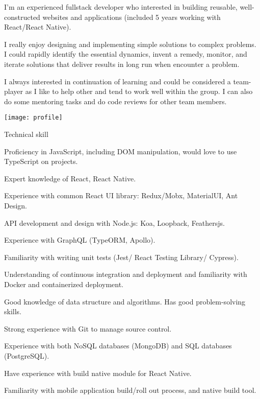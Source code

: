 \documentclass{resume}
\begin{document}

  \noindent\begin{minipage}{0.8\textwidth}%
    I'm an experienced fullstack developer who interested in building reusable, well-constructed websites and applications
    (included 5 years working with React/React Native). \newline
    
    I really enjoy designing and implementing simple solutions to complex problems. 
    I could rapidly identify the essential dynamics, invent a remedy, monitor, and iterate solutions 
    that deliver results in long run when encounter a problem. \newline

    I always interested in continuation of learning and could be considered a team-player as I like to help other and tend 
    to work well within the group. I can also do some mentoring tasks and do code reviews for other team members. \newline
    \end{minipage}%
    \hfill%
    \begin{minipage}{0.1\textwidth}\raggedright
      \texttt{[image: profile]}
    \end{minipage}

  \begin{rSection}{Technical skill}
    \begin{rSubsection}{}{}{}{}
      \item Proficiency in JavaScript, including DOM manipulation, would love to use TypeScript on projects.
      \item Expert knowledge of React, React Native.
      \item Experience with common React UI library: Redux/Mobx, MaterialUI, Ant Design.
      \item API development and design with Node.js: Koa, Loopback, Feathersjs.
      \item Experience with GraphQL (TypeORM, Apollo).
      \item Familiarity with writing unit tests (Jest/ React Testing Library/ Cypress).
      \item Understanding of continuous integration and deployment and familiarity with Docker and containerized deployment.
      \item Good knowledge of data structure and algorithms. Has good problem-solving skills.
      \item Strong experience with Git to manage source control.
      \item Experience with both NoSQL databases (MongoDB) and SQL databases (PostgreSQL).
      \item Have experience with build native module for React Native.
      \item Familiarity with mobile application build/roll out process, and native build tool.
    \end{rSubsection}
  \end{rSection}
  
\end{document}
